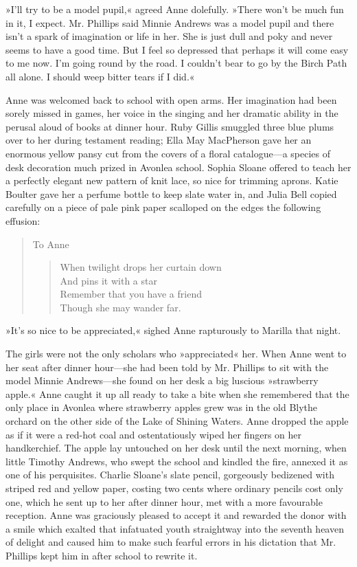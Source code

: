 »I'll try to be a model pupil,« agreed Anne dolefully. »There won't be much fun in it, I expect. Mr. Phillips said Minnie Andrews was a model pupil and there isn't a spark of imagination or life in her. She is just dull and poky and never seems to have a good time. But I feel so depressed that perhaps it will come easy to me now. I'm going round by the road. I couldn't bear to go by the Birch Path all alone. I should weep bitter tears if I did.«

Anne was welcomed back to school with open arms. Her imagination had been sorely missed in games, her voice in the singing and her dramatic ability in the perusal aloud of books at dinner hour. Ruby Gillis smuggled three blue plums over to her during testament reading; Ella May MacPherson gave her an enormous yellow pansy cut from the covers of a floral catalogue—a species of desk decoration much prized in Avonlea school. Sophia Sloane offered to teach her a perfectly elegant new pattern of knit lace, so nice for trimming aprons. Katie Boulter gave her a perfume bottle to keep slate water in, and Julia Bell copied carefully on a piece of pale pink paper scalloped on the edges the following effusion:

\begin{quote}
\noindent To Anne

\begin{verse}
When twilight drops her curtain down\\
And pins it with a star\\
Remember that you have a friend\\
Though she may wander far.
\end{verse}
\end{quote}

»It's so nice to be appreciated,« sighed Anne rapturously to Marilla that night.

The girls were not the only scholars who »appreciated« her. When Anne went to her seat after dinner hour—she had been told by Mr. Phillips to sit with the model Minnie Andrews—she found on her desk a big luscious »strawberry apple.« Anne caught it up all ready to take a bite when she remembered that the only place in Avonlea where strawberry apples grew was in the old Blythe orchard on the other side of the Lake of Shining Waters. Anne dropped the apple as if it were a red-hot coal and ostentatiously wiped her fingers on her handkerchief. The apple lay untouched on her desk until the next morning, when little Timothy Andrews, who swept the school and kindled the fire, annexed it as one of his perquisites. Charlie Sloane's slate pencil, gorgeously bedizened with striped red and yellow paper, costing two cents where ordinary pencils cost only one, which he sent up to her after dinner hour, met with a more favourable reception. Anne was graciously pleased to accept it and rewarded the donor with a smile which exalted that infatuated youth straightway into the seventh heaven of delight and caused him to make such fearful errors in his dictation that Mr. Phillips kept him in after school to rewrite it.

